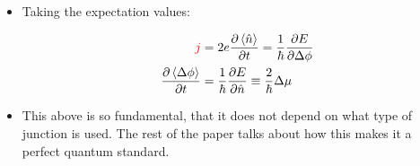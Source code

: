 {\begin{itemize}
  \item Taking the expectation values:
 		
    \begin{equation}\label{key}
      \begin{aligned}
        {\color{red}{j}} & = 2e \frac{\partial\left\langle \hat{n} \right\rangle}{\partial t} = \frac{1}{\hbar} \frac{\partial E}{\partial\Delta\phi}\\
         \frac{\partial\left\langle \Delta\phi \right\rangle}{\partial t} & = \frac{1}{\hbar}  \frac{\partial E}{\partial\hat{n}} \equiv \frac{2}{\hbar}\Delta\mu
      \end{aligned}
    \end{equation}
 		
    \noindent {}
 		
  \item This above is so fundamental, that it does not depend on what type of junction is used. The
    rest of the paper talks about how this makes it a perfect quantum standard.
  \end{itemize}
 }